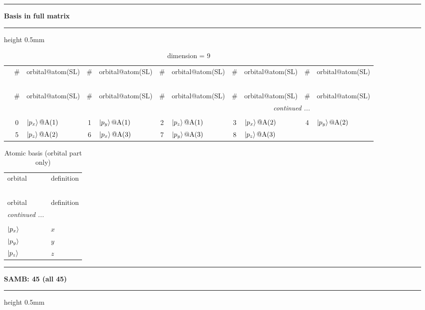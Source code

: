 \documentclass[fleqn,10pt,landscape]{jsarticle}
\begin{document}
\vspace{5mm}
\noindent \rule[0.5mm]{5mm}{0.5mm}\hspace{3mm}\textbf{Basis in full matrix}\hspace{3mm}\leaders\hrule height 0.5mm\hfill\kern0pt
\vspace{3mm}

\renewcommand{\arraystretch}{1.6}
\begin{longtable}[l]{c|cl|cl|cl|cl|cl}
\captionsetup{justification=raggedright, singlelinecheck=off}
\caption{dimension = 9}
 \\
 \hline \hline
 & \# & orbital@atom(SL) & \# & orbital@atom(SL) & \# & orbital@atom(SL) & \# & orbital@atom(SL) & \# & orbital@atom(SL) \\ \hline \endfirsthead

\multicolumn{10}{l}{\tablename\ \thetable{}} \\
 \hline \hline
 & \# & orbital@atom(SL) & \# & orbital@atom(SL) & \# & orbital@atom(SL) & \# & orbital@atom(SL) & \# & orbital@atom(SL) \\ \hline \endhead

 \hline \hline
\multicolumn{10}{r}{\footnotesize\it continued ...} \\ \endfoot

 \hline \hline
\multicolumn{10}{r}{} \\ \endlastfoot

 & 0 & $\ket{p_{x}}@{\rm A}(1)$ & 1 & $\ket{p_{y}}@{\rm A}(1)$ & 2 & $\ket{p_{z}}@{\rm A}(1)$ & 3 & $\ket{p_{x}}@{\rm A}(2)$ & 4 & $\ket{p_{y}}@{\rm A}(2)$ \\
& 5 & $\ket{p_{z}}@{\rm A}(2)$ & 6 & $\ket{p_{x}}@{\rm A}(3)$ & 7 & $\ket{p_{y}}@{\rm A}(3)$ & 8 & $\ket{p_{z}}@{\rm A}(3)$ &  &  \\
\end{longtable}
\renewcommand{\arraystretch}{1.6}
\begin{longtable}[l]{ll}
\captionsetup{justification=raggedright, singlelinecheck=off}
\caption{Atomic basis (orbital part only)}
 \\
 \hline \hline
orbital & definition \\ \hline \endfirsthead

\multicolumn{1}{l}{\tablename\ \thetable{}} \\
 \hline \hline
orbital & definition \\ \hline \endhead

 \hline \hline
\multicolumn{1}{r}{\footnotesize\it continued ...} \\ \endfoot

 \hline \hline
\multicolumn{1}{r}{} \\ \endlastfoot

$ \ket{p_{x}} $ & $ x $ \\
$ \ket{p_{y}} $ & $ y $ \\
$ \ket{p_{z}} $ & $ z $ \\
\end{longtable}
\vspace{5mm}
\noindent \rule[0.5mm]{5mm}{0.5mm}\hspace{3mm}\textbf{SAMB: 45 (all 45)}\hspace{3mm}\leaders\hrule height 0.5mm\hfill\kern0pt
\vspace{3mm}
\end{document}
